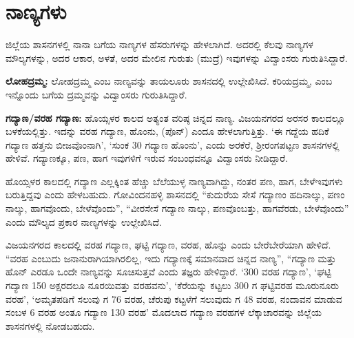 \section{ನಾಣ್ಯಗಳು}

ಜಿಲ್ಲೆಯ ಶಾಸನಗಳಲ್ಲಿ ನಾನಾ ಬಗೆಯ ನಾಣ್ಯಗಳ ಹೆಸರುಗಳನ್ನು ಹೇಳಲಾಗಿದೆ. ಅದರಲ್ಲಿ ಕೆಲವು ನಾಣ್ಯಗಳ ಮೌಲ್ಯಗಳನ್ನು, ಅದರ ಆಕಾರ, ಅಳತೆ, ಅದರ ಮೇಲಿನ ಗುರುತು (ಮುದ್ರೆ) ಇವುಗಳನ್ನು ವಿದ್ವಾಂಸರು ಗುರುತಿಸಿದ್ದಾರೆ.

\textbf{ಲೋಹದ್ರಮ್ಮ:} ಲೋಹದ್ರಮ್ಮ ಎಂಬ ನಾಣ್ಯವನ್ನು ತಾಯಲೂರು ಶಾಸನದಲ್ಲಿ ಉಲ್ಲೇಖಿಸಿದೆ. ಕರಿಯದ್ರಮ್ಮ, ಎಂಬ ಇನ್ನೊಂದು ಬಗೆಯ ದ್ರಮ್ಮವನ್ನು ವಿದ್ವಾಂಸರು ಗುರುತಿಸಿದ್ದಾರೆ.

\textbf{ಗದ್ಯಾಣ/ವರಹ ಗದ್ಯಾಣ: } ಹೊಯ್ಸಳರ ಕಾಲದ ಅತ್ಯಂತ ವರಿಷ್ಠ ಚಿನ್ನದ ನಾಣ್ಯ. ವಿಜಯನಗರದ ಅರಸರ ಕಾಲದಲ್ಲೂ ಬಳಕೆಯಲ್ಲಿತ್ತು. ಇದನ್ನು ವರಹ ಗದ್ಯಾಣ, ಹೊಂನು, (ಪೊನ್​) ಎಂದೂ ಹೇಳಲಾಗುತ್ತಿತ್ತು. ‘ಈ ಗದ್ದೆಯ ಹದಿಕೆ ಗದ್ಯಾಣ ಹತ್ತನು ಬೀಜವೊಂನಾಗಿ’, ‘ಸುಂಕ 30 ಗದ್ಯಾಣ ಹೊಂನು’, ಎಂದು ಅರಕೆರೆ, ಶ‍್ರೀರಂಗಪಟ್ಟಣ ಶಾಸನಗಳಲ್ಲಿ ಹೇಳಿವೆ. ಗದ್ಯಾಣಕ್ಕೂ, ಪಣ, ಹಾಗ ಇವುಗಳಿಗೆ ಇರುವ ಸಂಬಂಧವನ್ನೂ ವಿದ್ವಾಂಸರು ನೀಡಿದ್ದಾರೆ.

ಹೊಯ್ಸಳರ ಕಾಲದಲ್ಲಿ ಗದ್ಯಾಣ ಎಲ್ಲಕ್ಕಿಂತ ಹೆಚ್ಚು ಬೆಲೆಯುಳ್ಳ ನಾಣ್ಯವಾಗಿದ್ದು, ನಂತರ ಪಣ, ಹಾಗ, ಬೇಳೆ\break ಇವುಗಳು ಬರುತ್ತಿದ್ದವು ಎಂದು ಹೇಳಬಹುದು. ಗೋವಿಂದನಹಳ್ಳಿ ಶಾಸನದಲ್ಲಿ “ಕುದುರೆಯ ಸೇಸೆ ಗದ್ಯಾಣಂ ಹದಿನಾಲ್ಕು, ಪಣಂ ನಾಲ್ಕು, ಹಾಗವೊಂದು, ಬೇಳೆವೊಂದು”, “ವೀರಸೇಸೆ ಗದ್ಯಾಣ ನಾಲ್ಕು, ಪಣವೊಂಬತ್ತು, ಹಾಗವೆರಡು, ಬೇಳೆವೊಂದು” ಎಂದು ಮೌಲ್ಯದ ಪ್ರಕಾರ ನಾಣ್ಯಗಳನ್ನು ಉಲ್ಲೇಖಿಸಿದೆ.

ವಿಜಯನಗರದ ಕಾಲದಲ್ಲಿ ವರಹ ಗದ್ಯಾಣ, ಘಟ್ಟಿ ಗದ್ಯಾಣ, ವರಹ, ಹೊನ್ನು ಎಂದು ಬೇರೆಬೇರೆಯಾಗಿ ಹೇಳಿದೆ. “ವರಹ ಎಂಬುದು ಜನಾನುರಾಗಿಯಾಗಿರಲಿಲ್ಲ, ಇದು ಗದ್ಯಾಣಕ್ಕೆ ಸಮಾನವಾದ ಚಿನ್ನದ ನಾಣ್ಯ”, “ಗದ್ಯಾಣ ಮತ್ತು ಹೊನ್​ ಎರಡೂ ಒಂದೇ ನಾಣ್ಯವನ್ನು ಸೂಚಿಸುತ್ತವೆ ಎಂದು ತಜ್ಞರು ಹೇಳಿದ್ದಾರೆ. ‘300 ವರಹ ಗದ್ಯಾಣ’, ‘ಘಟ್ಟಿ ಗದ್ಯಾಣ 150 ಅಕ್ಷರದಲೂ ನೂರಯಿವತ್ತು ವರಹವನು’, ‘ಕೆರೆಯನ್ನು ಕಟ್ಟಲು 300 ಗ ಘಟ್ಟಿವರಹ ಮೂರುನೂರು ವರಹ’, ‘ಅಮೃತಪಡಿಗೆ ಸಲುವು ಗ 76 ವರಹ, ಚೆರುಪು ಕಟ್ಟಳೆಗೆ ಸಲುವುದು ಗ 48 ವರಹ, ನಂದಾವನ ಮಾಡುವ ಸಂಬಳ 6 ವರಹ ಅಂತೂ ಗದ್ಯಾಣ 130 ವರಹ’ ಮೊದಲಾದ ಗದ್ಯಾಣ ವರಹಗಳ ಲೆಕ್ಕಾಚಾರವನ್ನು ಜಿಲ್ಲೆಯ ಶಾಸನಗಳಲ್ಲಿ ನೋಡಬಹುದು.

